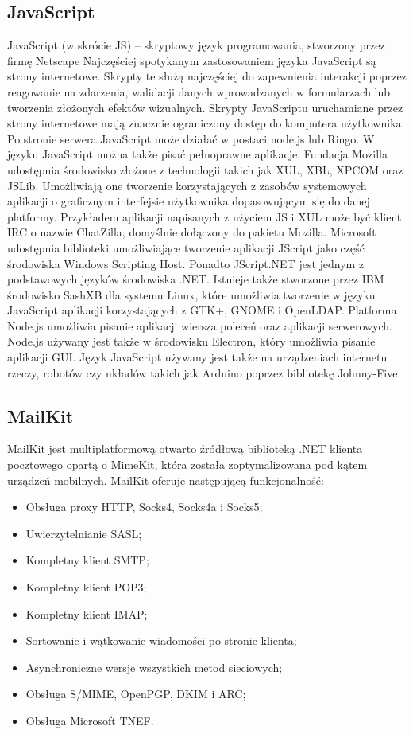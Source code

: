 \documentclass[12pt,a4paper]{article}
\begin{document}
		\subsection{JavaScript}
			\indent JavaScript (w skrócie JS) – skryptowy język programowania, stworzony przez firmę Netscape Najczęściej spotykanym zastosowaniem języka JavaScript
				są strony internetowe. Skrypty te służą najczęściej do zapewnienia interakcji poprzez reagowanie na zdarzenia, walidacji danych wprowadzanych w formularzach
				lub tworzenia złożonych efektów wizualnych. Skrypty JavaScriptu uruchamiane przez strony internetowe mają znacznie ograniczony dostęp do komputera użytkownika.
				Po stronie serwera JavaScript może działać w postaci node.js lub Ringo. W języku JavaScript można także pisać pełnoprawne aplikacje. Fundacja Mozilla udostępnia
				środowisko złożone z technologii takich jak XUL, XBL, XPCOM oraz JSLib. Umożliwiają one tworzenie korzystających z zasobów systemowych aplikacji
				o graficznym interfejsie użytkownika dopasowującym się do danej platformy. Przykładem aplikacji napisanych z użyciem JS i XUL może być klient IRC o nazwie
				ChatZilla, domyślnie dołączony do pakietu Mozilla. Microsoft udostępnia biblioteki umożliwiające tworzenie aplikacji JScript jako część środowiska Windows
				Scripting Host. Ponadto JScript.NET jest jednym z podstawowych języków środowiska .NET. Istnieje także stworzone przez IBM środowisko SashXB dla systemu Linux,
				które umożliwia tworzenie w języku JavaScript aplikacji korzystających z GTK+, GNOME i OpenLDAP. Platforma Node.js umożliwia pisanie aplikacji wiersza poleceń oraz
				aplikacji serwerowych. Node.js używany jest także w środowisku Electron, który umożliwia pisanie aplikacji GUI. Język JavaScript używany jest także na urządzeniach
				internetu rzeczy, robotów czy układów takich jak Arduino poprzez bibliotekę Johnny-Five. 		
		
		\subsection{MailKit}
			\indent MailKit jest multiplatformową otwarto źródłową biblioteką .NET klienta pocztowego opartą o MimeKit, która została zoptymalizowana pod kątem urządzeń mobilnych.
			MailKit oferuje następującą funkcjonalność:
			\begin{itemize}
				\item Obsługa proxy HTTP, Socks4, Socks4a i Socks5;
				\item Uwierzytelnianie SASL;
				\item Kompletny klient SMTP;
				\item Kompletny klient POP3;
				\item Kompletny klient IMAP;
				\item Sortowanie i wątkowanie wiadomości po stronie klienta;
				\item Asynchroniczne wersje wszystkich metod sieciowych;
				\item Obsługa S/MIME, OpenPGP, DKIM i ARC;
				\item Obsługa Microsoft TNEF.
			\end{itemize}
\end{document}

